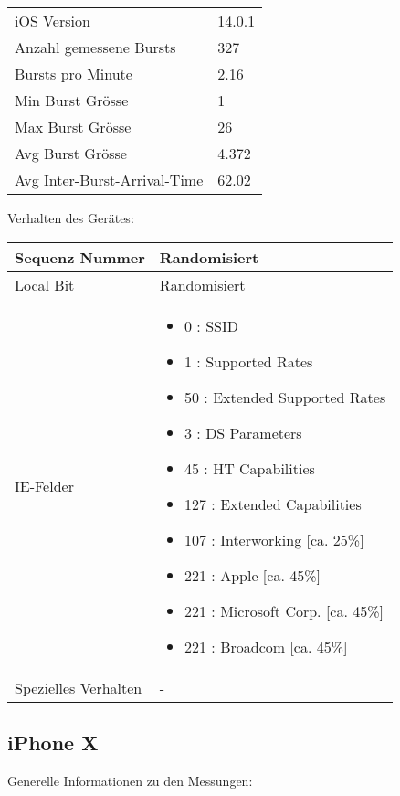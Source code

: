 \begin{table}[h!]
    \begin{tabularx}{\textwidth}{l X }
        \toprule
        iOS Version & 14.0.1\\
        Anzahl gemessene Bursts & 327 \\
        Bursts pro Minute & 2.16 \\
        Min Burst Grösse & 1 \\
        Max Burst Grösse & 26 \\
        Avg Burst Grösse & 4.372 \\
        Avg Inter-Burst-Arrival-Time & 62.02 \\
        \bottomrule
    \end{tabularx}
\end{table}

Verhalten des Gerätes:

\begin{table}[h!]
    \begin{tabularx}{\textwidth}{l X }
        \toprule
        Sequenz Nummer & Randomisiert \\
        \midrule
        Local Bit & Randomisiert \\
        \midrule
        IE-Felder & \begin{itemize}
            \item 0 : SSID
            \item 1 : Supported Rates
            \item 50 : Extended Supported Rates
            \item 3 : DS Parameters
            \item 45 : HT Capabilities 
            \item 127 : Extended Capabilities
            \item 107 : Interworking [ca. 25\%]
            \item 221 : Apple [ca. 45\%]
            \item 221 : Microsoft Corp. [ca. 45\%]
            \item 221 : Broadcom [ca. 45\%]
        \end{itemize} \\
        \midrule
        Spezielles Verhalten & - \\
        \bottomrule
    \end{tabularx}
\end{table}
\clearpage


\subsection*{iPhone X}
Generelle Informationen zu den Messungen:

